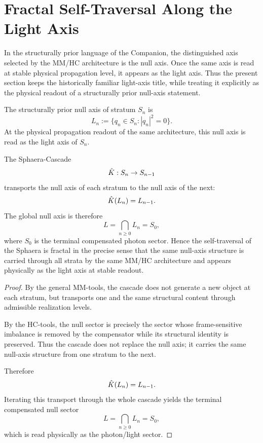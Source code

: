 \section{Fractal Self-Traversal Along the Light Axis}
\label{sec:fractal}

\begin{remark}
In the structurally prior language of the Companion, the distinguished
axis selected by the MM/HC architecture is the null axis. Once the same
axis is read at stable physical propagation level, it appears as the
light axis. Thus the present section keeps the historically familiar
light-axis title, while treating it explicitly as the physical readout
of a structurally prior null-axis statement.
\end{remark}

\begin{definition}
The structurally prior null axis of stratum $S_n$ is
\[
L_n:=\{q_n\in S_n:|q_n|^2=0\}.
\]
At the physical propagation readout of the same architecture, this null
axis is read as the light axis of $S_n$.
\end{definition}

\begin{theorem}\label{thm:fractal}
The Sphaera-Cascade
\[
\hat{K}:S_n\to S_{n-1}
\]
transports the null axis of each stratum to the null axis of the next:
\[
\hat{K}(L_n)=L_{n-1}.
\]
The global null axis is therefore
\[
L=\bigcap_{n\ge 0}L_n=S_0,
\]
where $S_0$ is the terminal compensated photon sector.
Hence the self-traversal of the Sphaera is fractal in the precise sense
that the same null-axis structure is carried through all strata by the
same MM/HC architecture and appears physically as the light axis at
stable readout.
\end{theorem}

\begin{proof}
By the general MM-tools, the cascade does not generate a new object at
each stratum, but transports one and the same structural content through
admissible realization levels.

By the HC-tools, the null sector is precisely the sector whose
frame-sensitive imbalance is removed by the compensator while its
structural identity is preserved.
Thus the cascade does not replace the null axis; it carries the same
null-axis structure from one stratum to the next.

Therefore
\[
\hat{K}(L_n)=L_{n-1}.
\]
Iterating this transport through the whole cascade yields the terminal
compensated null sector
\[
L=\bigcap_{n\ge 0}L_n=S_0,
\]
which is read physically as the photon/light sector.
\end{proof}

